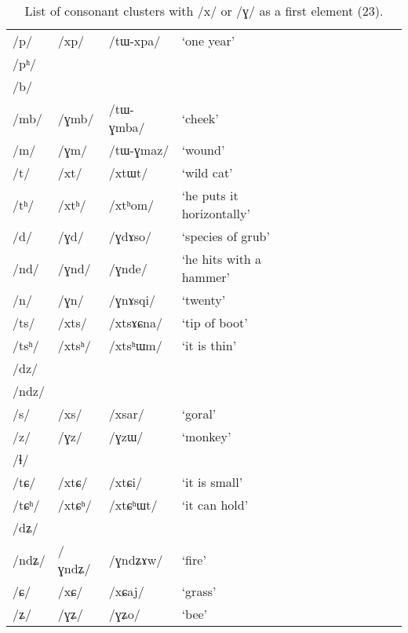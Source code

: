 \documentclass[12pt]{article}
\newcommand{\ipa}[1]{\mbox{\phon/#1/}}
\newcommand{\ipab}[1]{{\phon#1}}
\newcommand{\deux}[1]{\ipa{#1}\addtocounter{2clusters}{1}}
\begin{document}
 \begin{table}
 \caption{List of consonant clusters with  \ipa{x} or \ipa{ɣ} as a first element (23).} \label{preinit.x} 
\begin{tabular}{lllllllllll}
\toprule
\ipa{p}  & 	 \deux{xp}  & 	 \ipa{tɯ-xpa}  & 	 `one year'  & 	\\
\ipa{pʰ}  & 	  & 	  & 	  & 	\\
\ipa{b}  & 	  & 	  & 	  & 	\\
\ipa{mb}  & 	 \deux{ɣmb}  & 	 \ipa{tɯ-ɣmba}  & 	 `cheek'  & 	\\
\ipa{m}  & 	 \deux{ɣm}  & 	 \ipa{tɯ-ɣmaz}  & 	 `wound'  & 	\\
\ipa{t}  & 	 \deux{xt}  & 	 \ipa{xtɯt}  & 	 `wild cat'  & 	\\
\ipa{tʰ}  & 	 \deux{xtʰ}  & 	 \ipa{xtʰom}  & 	 `he puts it horizontally'  & 	\\
\ipa{d}  & 	 \deux{ɣd}  & 	 \ipa{ɣdɤso}  & 	 `species of grub'  & 	\\
\ipa{nd}  & 	 \deux{ɣnd}  & 	 \ipa{ɣnde}  & 	 `he hits with a hammer'  & 	\\
\ipa{n}  & 	 \deux{ɣn}  & 	 \ipa{ɣnɤsqi}  & 	 `twenty'  & 	\\
\ipa{ts}  & 	 \deux{xts}  & 	 \ipa{xtsɤɕna}  & 	 `tip of boot'  & 	\\
\ipa{tsʰ}  & 	 \deux{xtsʰ}  & 	 \ipa{xtsʰɯm}  & 	 `it is thin'  & 	\\
\ipa{dz}  & 	  & 	  & 	  & 	\\
\ipa{ndz}  & 	  & 	  & 	  & 	\\
\ipa{s}  & 	 \deux{xs}  & 	 \ipa{xsar}  & 	 `goral'  & 	\\
\ipa{z}  & 	 \deux{ɣz}  & 	 \ipa{ɣzɯ}  & 	 `monkey'  & 	\\
\ipa{ɬ}  & 	  & 	  & 	  & 	\\
\ipa{tɕ}  & 	 \deux{xtɕ}  & 	 \ipa{xtɕi}  & 	 `it is small'  & 	\\
\ipa{tɕʰ}  & 	 \deux{xtɕʰ}  & 	 \ipa{xtɕʰɯt}  & 	 `it can hold'  & 	\\
\ipa{dʑ}  & 	  & 	  & 	  & 	\\
\ipa{ndʑ}  & 	 \deux{ɣndʑ}  & 	 \ipa{ɣndʑɤw}  & 	 `fire'  & 	\\
\ipa{ɕ}  & 	 \deux{xɕ}  & 	 \ipa{xɕaj}  & 	 `grass'  & 	\\
\ipa{ʑ}  & 	 \deux{ɣʑ}  & 	 \ipa{ɣʑo}  & 	 `bee'  & 	\\

\end{tabular}
\end{table}
\end{document}
